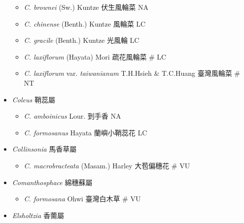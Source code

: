 \begin{itemize}
  \begin{itemize}
        \item[] \textit{C. brownei} (Sw.) Kuntze  伏生風輪菜   NA
        \item[] \textit{C. chinense} (Benth.) Kuntze  風輪菜   LC
        \item[] \textit{C. gracile} (Benth.) Kuntze  光風輪   LC
        \item[] \textit{C. laxiflorum} (Hayata) Mori  疏花風輪菜  \# LC
        \item[] \textit{C. laxiflorum} var. \textit{taiwanianum} T.H.Hsieh \& T.C.Huang  臺灣風輪菜  \# NT
  \end{itemize}
 \item[] \textit{Coleus} 鞘蕊屬
                                
  \begin{itemize}
        \item[] \textit{C. amboinicus} Lour.  到手香   NA
        \item[] \textit{C. formosanus} Hayata  蘭嶼小鞘蕊花   LC
  \end{itemize}
 \item[] \textit{Collinsonia} 馬香草屬
                                
  \begin{itemize}
        \item[] \textit{C. macrobracteata} (Masam.) Harley  大苞偏穗花  \# VU
  \end{itemize}
 \item[] \textit{Comanthosphace} 綿穗蘇屬
                                
  \begin{itemize}
        \item[] \textit{C. formosana} Ohwi  臺灣白木草  \# VU
  \end{itemize}
 \item[] \textit{Elsholtzia} 香薷屬
                                

\end{itemize}
